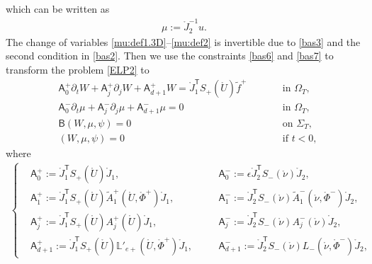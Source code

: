 \documentclass[twoside,11pt]{article}
\numberwithin{equation}{section}
\def\p{\partial}
\begin{document}
which can be written as
\begin{align}
	\label{mu:def2}
	\mu:=\mathring{J}_2^{-1}u.
\end{align}
The change of variables \eqref{mu:def1.3D}--\eqref{mu:def2} is invertible due to \eqref{bas3} and the second condition in \eqref{bas2}.
	Then we use the constraints \eqref{bas6} and \eqref{bas7} to transform the problem \eqref{ELP2}  to
	\begin{subequations}
		\label{ELP3}
		\begin{alignat}{3}
			\label{ELP3a}
			&{\mathsf{A}}_0^+\p_t W+ {\mathsf{A}}_j^+\p_j W +{\mathsf{A}}_{d+1}^+ W =\mathring{J}_1^{\mathsf{T}}S_+(\mathring{U})\tilde{f}^+
			&\qquad &\textrm{in }\Omega_T,\\[1mm]
			\label{ELP3b}
			&{\mathsf{A}}_0^-\p_t   \mu+  {\mathsf{A}}_j^-\p_j   \mu  +{\mathsf{A}}_{d+1}^- \mu =0
			&&\textrm{in }\Omega_T,\\[1mm]
			\label{ELP3c}
&
\mathsf{B}(W,\mu, \psi) =0
&& \textrm{on }\Sigma_T,\\[1mm]
			\label{ELP3d}
			&
			(W,\mu, \psi) =0
			&& \textrm{if } t<0,
		\end{alignat}
	\end{subequations}
where
	\begin{align}
\left\{\begin{aligned}		
			&{\mathsf{A}}_{0}^{+}:= \mathring{J}_1^{\mathsf{T}}S_{+}(\mathring{U})\mathring{J}_1,\quad &&
			{\mathsf{A}}_{0}^{-}:=\epsilon\mathring{J}_2^{\mathsf{T}}S_{-}(\mathring{\nu})\mathring{J}_2, 	
			\\[0.5mm]
			& 		{\mathsf{A}}_{1}^{+}:= \mathring{J}_1^{\mathsf{T}}S_{+}(\mathring{U})\widetilde{A}_{1}^{+}(\mathring{U},\mathring{\Phi}^+)\mathring{J}_1,\quad &&
			{\mathsf{A}}_{1}^{-}:=\mathring{J}_2^{\mathsf{T}}S_{-}(\mathring{\nu})\widetilde{A}_{1}^{-}(\mathring{\nu},\mathring{\Phi}^-)\mathring{J}_2,\\[0.5mm]
			&{\mathsf{A}}_{j}^{+}:= \mathring{J}_1^{\mathsf{T}}S_{+}(\mathring{U}){A}_{j}^{+}(\mathring{U})\mathring{J}_1,\quad&&
			{\mathsf{A}}_{j}^{-}:=\mathring{J}_2^{\mathsf{T}}S_{-}(\mathring{\nu}){A}_{j}^{-}(\mathring{\nu})\mathring{J}_2, \\[0.5mm]
			&	{\mathsf{A}}_{d+1}^{+}:= \mathring{J}_1^{\mathsf{T}}S_{+}(\mathring{U})\mathbb{L}'_{e+}(\mathring{U}, \mathring{\Phi}^+) \mathring{J}_1,
			\quad &&
			{\mathsf{A}}_{d+1}^{-}:=\mathring{J}_2^{\mathsf{T}}S_{-}(\mathring{\nu})L_-(\mathring{\nu}, \mathring{\Phi}^-) \mathring{J}_2,
\end{aligned}\right.		
		\label{A.sf:def}
	\end{align}
\end{document}
